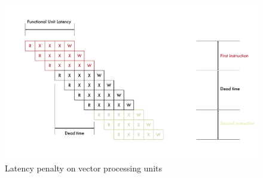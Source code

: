 \begin{figure}[H]
    \centering
    \includegraphics[scale = 0.5]{Chapter_1/img/lat-pen.png}
    \caption{Latency penalty on vector processing units \cite{L15-Krste}}
    \label{Vector-Latency}
\end{figure}

